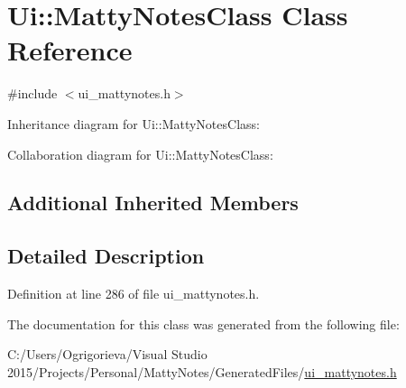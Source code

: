 \hypertarget{classUi_1_1MattyNotesClass}{}\section{Ui\+:\+:Matty\+Notes\+Class Class Reference}
\label{classUi_1_1MattyNotesClass}


{\ttfamily \#include $<$ui\+\_\+mattynotes.\+h$>$}



Inheritance diagram for Ui\+:\+:Matty\+Notes\+Class\+:


Collaboration diagram for Ui\+:\+:Matty\+Notes\+Class\+:
\subsection*{Additional Inherited Members}


\subsection{Detailed Description}


Definition at line 286 of file ui\+\_\+mattynotes.\+h.



The documentation for this class was generated from the following file\+:\begin{DoxyCompactItemize}
\item 
C\+:/\+Users/\+Ogrigorieva/\+Visual Studio 2015/\+Projects/\+Personal/\+Matty\+Notes/\+Generated\+Files/\hyperlink{ui__mattynotes_8h}{ui\+\_\+mattynotes.\+h}\end{DoxyCompactItemize}
